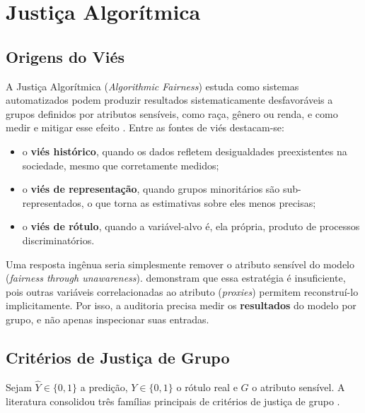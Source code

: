 \section{Justiça Algorítmica}
\label{sec:rt_fairness}

\subsection{Origens do Viés}

A Justiça Algorítmica (\textit{Algorithmic Fairness}) estuda como sistemas automatizados podem produzir resultados sistematicamente desfavoráveis a grupos definidos por atributos sensíveis, como raça, gênero ou renda, e como medir e mitigar esse efeito \cite{barocas2023fairness, mehrabi2021survey}. Entre as fontes de viés destacam-se:
\begin{itemize}
    \item o \textbf{viés histórico}, quando os dados refletem desigualdades preexistentes na sociedade, mesmo que corretamente medidos;
    \item o \textbf{viés de representação}, quando grupos minoritários são sub-representados, o que torna as estimativas sobre eles menos precisas;
    \item o \textbf{viés de rótulo}, quando a variável-alvo é, ela própria, produto de processos discriminatórios.
\end{itemize}

Uma resposta ingênua seria simplesmente remover o atributo sensível do modelo (\textit{fairness through unawareness}).  demonstram que essa estratégia é insuficiente, pois outras variáveis correlacionadas ao atributo (\textit{proxies}) permitem reconstruí-lo implicitamente. Por isso, a auditoria precisa medir os \textbf{resultados} do modelo por grupo, e não apenas inspecionar suas entradas.

\subsection{Critérios de Justiça de Grupo}

Sejam $\hat{Y} \in \{0,1\}$ a predição, $Y \in \{0,1\}$ o rótulo real e $G$ o atributo sensível. A literatura consolidou três famílias principais de critérios de justiça de grupo \cite{barocas2023fairness}.

